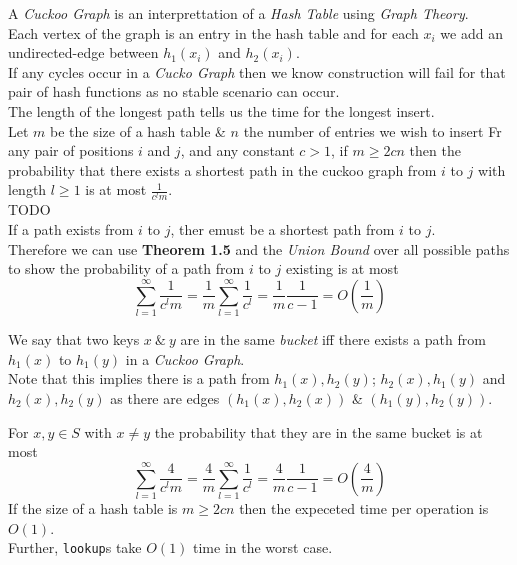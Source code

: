 \documentclass[11pt,a4paper]{article}
\begin{document}
A \textit{Cuckoo Graph} is an interprettation of a \textit{Hash Table} using \textit{Graph Theory}.\\
Each vertex of the graph is an entry in the hash table and for each $x_i$ we add an undirected-edge between $h_1(x_i)$ and $h_2(x_i)$.\\
If any cycles occur in a \textit{Cucko Graph} then we know construction will fail for that pair of hash functions as no stable scenario can occur.\\
The length of the longest path tells us the time for the longest insert.\\

Let $m$ be the size of a hash table \& $n$ the number of entries we wish to insert
Fr any pair of positions $i$ and $j$, and any constant $c>1$, if $m\geq2cn$ then the probability that there exists a shortest path in the cuckoo graph from $i$ to $j$ with length $l\geq1$ is at most $\frac1{c^lm}$.\\

TODO\\

If a path exists from $i$ to $j$, ther emust be a shortest path from $i$ to $j$.\\
Therefore we can use \textbf{Theorem 1.5} and the \textit{Union Bound} over all possible paths to show the probability of a path from $i$ to $j$ existing is at most
$$\sum_{l=1}^\infty\frac1{c^lm}=\frac1m\sum_{l=1}^\infty\frac1{c^l}=\frac1m\frac1{c-1}=O\left(\frac1m\right)$$

We say that two keys $x\ \&\ y$ are in the same \textit{bucket} iff there exists a path from $h_1(x)$ to $h_1(y)$ in a \textit{Cuckoo Graph}.\\
Note that this implies there is a path from $h_1(x),h_2(y)$; $h_2(x),h_1(y)$ and $h_2(x),h_2(y)$ as there are edges $(h_1(x),h_2(x))$ \& $(h_1(y),h_2(y))$.\\


For $x,y\in S$ with $x\neq y$ the probability that they are in the same bucket is at most
$$\sum_{l=1}^\infty\frac4{c^lm}=\frac4m\sum_{l=1}^\infty\frac1{c^l}=\frac4m\frac1{c-1}=O\left(\frac4m\right)$$
If the size of a hash table is $m\geq2cn$ then the expeceted time per operation is $O(1)$.\\
Further, \lstinline!lookup!s take $O(1)$ time in the worst case.\\
\end{document}
